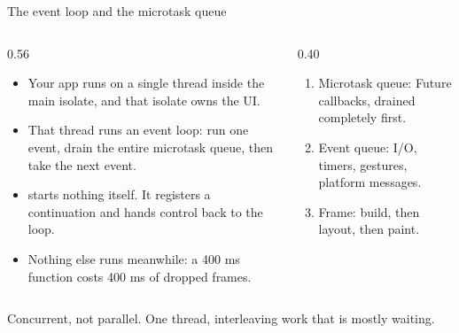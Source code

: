 \documentclass[10pt,aspectratio=169,t]{beamer}
\begin{document}
\begin{frame}[eyebrow=Foundations]{The event loop and the microtask queue}
  \begin{columns}[T]
    \begin{column}{0.56\textwidth}
      \begin{itemize}
        \item Your app runs on a single thread inside the main isolate, and that isolate owns the UI.
        \item That thread runs an event loop: run one event, drain the entire microtask queue, then take the next event.
        \item {} starts nothing itself. It registers a continuation and hands control back to the loop.
        \item Nothing else runs meanwhile: a 400 ms function costs 400 ms of dropped frames.
      \end{itemize}
    \end{column}
    \begin{column}{0.40\textwidth}
      \begin{enumerate}
        \item Microtask queue: Future callbacks, drained completely first.
        \item Event queue: I/O, timers, gestures, platform messages.
        \item Frame: build, then layout, then paint.
      \end{enumerate}
    \end{column}
  \end{columns}
  \begin{takeaway}{Concurrent, not parallel.}
    One thread, interleaving work that is mostly waiting.
  \end{takeaway}
\end{frame}
\end{document}
